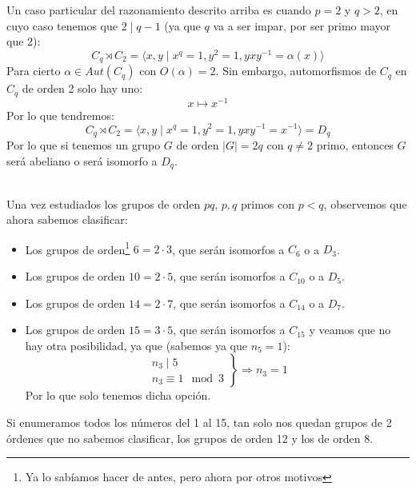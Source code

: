 \begin{ejemplo}
    Un caso particular del razonamiento descrito arriba es cuando $p = 2$ y $q >2$, en cuyo caso tenemos que $2 \mid q-1$ (ya que $q$ va a ser impar, por ser primo mayor que 2):
    \begin{equation*}
        C_q \rtimes C_2 = \langle x,y\mid x^q = 1, y^2 = 1, yxy^{-1} = \alpha(x) \rangle 
    \end{equation*}
    Para cierto $\alpha\in Aut(C_q)$ con $O(\alpha) = 2$. Sin embargo, automorfismos de $C_q$ en $C_q$ de orden 2 solo hay uno:
    \begin{equation*}
        x \longmapsto x^{-1}
    \end{equation*}
    Por lo que tendremos:
    \begin{equation*}
        C_q \rtimes C_2 = \langle x,y \mid x^q = 1, y^2 = 1, yxy^{-1}=x^{-1} \rangle  = D_q
    \end{equation*}
    Por lo que si tenemos un grupo $G$ de orden $|G| = 2q$ con $q\neq 2$ primo, entonces $G$ será abeliano o será isomorfo a $D_q$.
\end{ejemplo}~\\

Una vez estudiados los grupos de orden $pq$, $p,q$ primos con $p<q$, observemos que ahora sabemos clasificar:
\begin{itemize}
    \item Los grupos de orden\footnote{Ya lo sabíamos hacer de antes, pero ahora por otros motivos} $6 = 2\cdot 3$, que serán isomorfos a $C_6$ o a $D_3$.
    \item Los grupos de orden $10 = 2\cdot 5$, que serán isomorfos a $C_{10}$ o a $D_5$.
    \item Los grupos de orden $14 = 2\cdot 7$, que serán isomorfos a $C_{14}$ o a $D_7$.
    \item Los grupos de orden $15 = 3\cdot 5$, que serán isomorfos a $C_{15}$ y veamos que no hay otra posibilidad, ya que (sabemos ya que $n_5 = 1$):
        \begin{equation*}
            \left.\begin{array}{r}
                n_3 \mid 5 \\
                n_3 \equiv 1 \mod 3
            \end{array}\right\} \Longrightarrow n_3 = 1
        \end{equation*}
        Por lo que solo tenemos dicha opción.
\end{itemize}

Si enumeramos todos los números del 1 al 15, tan solo nos quedan grupos de 2 órdenes que no sabemos clasificar, los grupos de orden 12 y los de orden 8.

